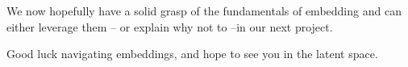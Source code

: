 \documentclass[11pt, table]{diazessay} %
\begin{document}
\begin{sloppypar}
We now hopefully have a solid grasp of the fundamentals of embedding and can either leverage them -- or explain why not to --in our next project. 
 
Good luck navigating embeddings, and hope to see you in the latent space. 


\newpage


\newpage



\end{sloppypar}
\end{document}
